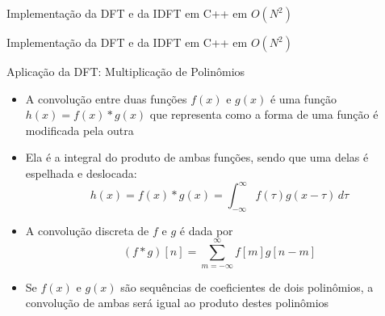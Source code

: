 \begin{frame}[fragile]{Implementação da DFT e da IDFT em C++ em $O(N^2)$}
\end{frame}

\begin{frame}[fragile]{Implementação da DFT e da IDFT em C++ em $O(N^2)$}
\end{frame}

\begin{frame}[fragile]{Aplicação da DFT: Multiplicação de Polinômios}

    \begin{itemize}
        \item A convolução entre duas funções $f(x)$ e $g(x)$ é uma função $h(x) = f(x)*g(x)$
            que representa como a forma de uma função é modificada pela outra

        \item Ela é a integral do produto de ambas funções, sendo que uma delas é espelhada e
            deslocada:
        \[
            h(x) = f(x)*g(x) = \int_{-\infty}^\infty f(\tau)g(x - \tau)\, d\tau
        \]

        \item A convolução discreta de $f$ e $g$ é dada por
        \[
            (f * g)[n] = \sum_{m=-\infty}^\infty f[m]g[n - m]
        \]

        \item Se $f(x)$ e $g(x)$ são sequências de coeficientes de dois polinômios, a convolução
            de ambas será igual ao produto destes polinômios
    \end{itemize}

\end{frame}



